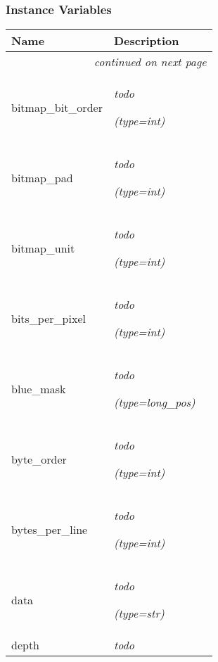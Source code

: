 
  \subsubsection{Instance Variables}

    \vspace{-1cm}
\hspace{\varindent}\begin{longtable}{|p{\varnamewidth}|p{\vardescrwidth}|l}
\cline{1-2}
\cline{1-2} \centering \textbf{Name} & \centering \textbf{Description}& \\
\cline{1-2}
\endhead\cline{1-2}\multicolumn{3}{r}{\small\textit{continued on next page}}\\\endfoot\cline{1-2}
\endlastfoot\raggedright b\-i\-t\-m\-a\-p\-\_\-b\-i\-t\-\_\-o\-r\-d\-e\-r\- & \raggedright \emph{todo}

            {\it (type=int)}&\\
\cline{1-2}
\raggedright b\-i\-t\-m\-a\-p\-\_\-p\-a\-d\- & \raggedright \emph{todo}

            {\it (type=int)}&\\
\cline{1-2}
\raggedright b\-i\-t\-m\-a\-p\-\_\-u\-n\-i\-t\- & \raggedright \emph{todo}

            {\it (type=int)}&\\
\cline{1-2}
\raggedright b\-i\-t\-s\-\_\-p\-e\-r\-\_\-p\-i\-x\-e\-l\- & \raggedright \emph{todo}

            {\it (type=int)}&\\
\cline{1-2}
\raggedright b\-l\-u\-e\-\_\-m\-a\-s\-k\- & \raggedright \emph{todo}

            {\it (type=long\_pos)}&\\
\cline{1-2}
\raggedright b\-y\-t\-e\-\_\-o\-r\-d\-e\-r\- & \raggedright \emph{todo}

            {\it (type=int)}&\\
\cline{1-2}
\raggedright b\-y\-t\-e\-s\-\_\-p\-e\-r\-\_\-l\-i\-n\-e\- & \raggedright \emph{todo}

            {\it (type=int)}&\\
\cline{1-2}
\raggedright d\-a\-t\-a\- & \raggedright \emph{todo}

            {\it (type=str)}&\\
\cline{1-2}
\raggedright d\-e\-p\-t\-h\- & \raggedright \emph{todo}


\end{longtable}
